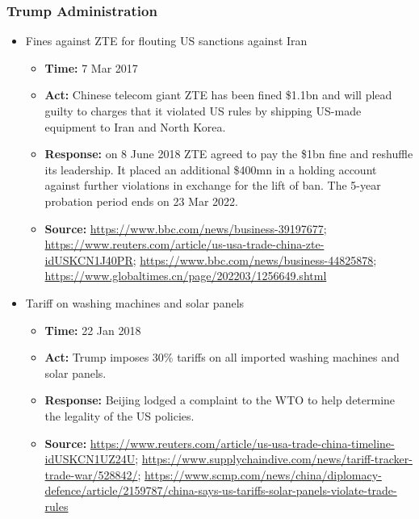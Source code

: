 		\subsubsection{Trump Administration}
			\begin{itemize}
			\item Fines against ZTE for flouting US sanctions against Iran
				\begin{itemize}
				\item \textbf{Time: }7 Mar 2017
				\item \textbf{Act: }Chinese telecom giant ZTE has been fined \$1.1bn and will plead guilty to charges that it violated US rules by shipping US-made equipment to Iran and North Korea.
				\item \textbf{Response: } on 8 June 2018 ZTE agreed to pay the \$1bn fine and reshuffle its leadership. It placed an additional \$400mn in a holding account against further violations in exchange for the lift of ban. The 5-year probation period ends on 23 Mar 2022.
				\item	\textbf{Source: }\url{https://www.bbc.com/news/business-39197677}; \url{https://www.reuters.com/article/us-usa-trade-china-zte-idUSKCN1J40PR}; \url{https://www.bbc.com/news/business-44825878}; \url{https://www.globaltimes.cn/page/202203/1256649.shtml}
				\end{itemize}

			\item Tariff on washing machines and solar panels
				\begin{itemize}
				\item \textbf{Time: } 22 Jan 2018
				\item \textbf{Act: } Trump imposes 30\% tariffs on all imported washing machines and solar panels.
				\item \textbf{Response: }Beijing lodged a complaint to the WTO to help determine the legality of the US policies.
				\item \textbf{Source:} \url{https://www.reuters.com/article/us-usa-trade-china-timeline-idUSKCN1UZ24U}; \url{https://www.supplychaindive.com/news/tariff-tracker-trade-war/528842/}; \url{https://www.scmp.com/news/china/diplomacy-defence/article/2159787/china-says-us-tariffs-solar-panels-violate-trade-rules}
				\end{itemize}


\end{itemize}
